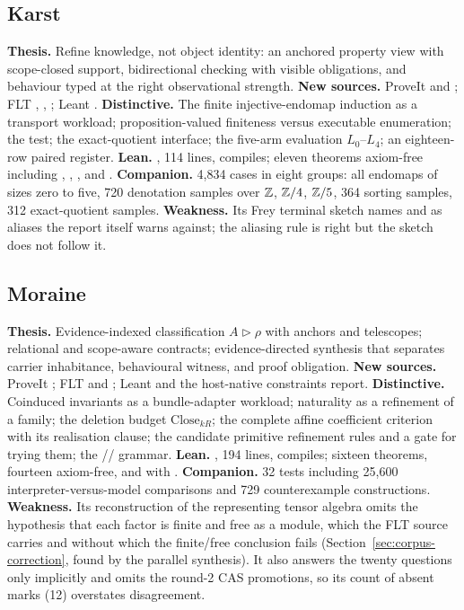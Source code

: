\subsection*{Karst}
\textbf{Thesis.} Refine knowledge, not object identity: an anchored property view with scope-closed support, bidirectional checking with visible obligations, and behaviour typed at the right observational strength. \textbf{New sources.} ProveIt  and ; FLT , , ; Leant . \textbf{Distinctive.} The finite injective-endomap induction as a transport workload; proposition-valued finiteness versus executable enumeration; the  test; the exact-quotient interface; the five-arm evaluation $L_0$--$L_4$; an eighteen-row paired register. \textbf{Lean.} , 114 lines, compiles; eleven theorems axiom-free including , , , and . \textbf{Companion.} 4,834 cases in eight groups: all endomaps of sizes zero to five, 720 denotation samples over $\mathbb Z$, $\mathbb Z/4$, $\mathbb Z/5$, 364 sorting samples, 312 exact-quotient samples. \textbf{Weakness.} Its Frey terminal sketch names  and  as aliases the report itself warns against; the aliasing rule is right but the sketch does not follow it.

\subsection*{Moraine}
\textbf{Thesis.} Evidence-indexed classification $A\triangleright\rho$ with anchors and telescopes; relational and scope-aware contracts; evidence-directed synthesis that separates carrier inhabitance, behavioural witness, and proof obligation. \textbf{New sources.} ProveIt ; FLT  and ; Leant  and the host-native constraints report. \textbf{Distinctive.} Coinduced invariants as a bundle-adapter workload; naturality as a refinement of a family; the deletion budget $\mathrm{Close}_{kR}$; the complete affine coefficient criterion with its realisation clause; the candidate primitive refinement rules and a gate for trying them; the // grammar. \textbf{Lean.} , 194 lines, compiles; sixteen theorems, fourteen axiom-free,  and  with . \textbf{Companion.} 32 tests including 25,600 interpreter-versus-model comparisons and 729 counterexample constructions. \textbf{Weakness.} Its reconstruction of the representing tensor algebra omits the hypothesis that each factor is finite and free as a module, which the FLT source carries and without which the finite/free conclusion fails (Section~\ref{sec:corpus-correction}, found by the parallel synthesis). It also answers the twenty questions only implicitly and omits the round-2 CAS promotions, so its count of absent marks (12) overstates disagreement.

